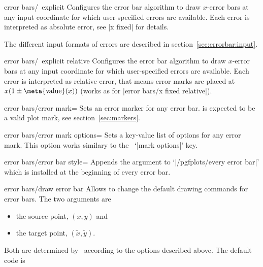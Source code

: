 {\begin{pgfplotsxykey}{error bars/\x\ explicit}
Configures the error bar algorithm to draw $x$-error bars at any input coordinate for which user-specified errors are available.
 Each error is interpreted as absolute error, see |x fixed| for details.

The different input formats of errors are described in section~\ref{sec:errorbar:input}.
\end{pgfplotsxykey}

\begin{pgfplotsxykey}{error bars/\x\ explicit relative}
Configures the error bar algorithm to draw $x$-error bars at any input coordinate for which user-specified errors are available.
 Each error is interpreted as relative error, that means error marks are placed at $x (1 \pm \text{\meta{value}}(x))$ (works as for |error bars/x fixed relative|).
\end{pgfplotsxykey}


\begin{pgfplotskey}{error bars/error mark=}
Sets an error marker for any error bar.  is expected to be a valid plot mark, see section~\ref{sec:markers}.
\end{pgfplotskey}

\begin{pgfplotskey}{error bars/error mark options=}
Sets a key-value list of options for any error mark. This option works similary to the \Tikz\ `|mark options|' key.
\end{pgfplotskey}

\begin{pgfplotskey}{error bars/error bar style=}
Appends the argument to `|/pgfplots/every error bar|' which is installed at the beginning of every error bar.
\end{pgfplotskey}

\begin{pgfplotscodetwokey}{error bars/draw error bar}
Allows to change the default drawing commands for error bars. The two arguments are
\begin{itemize} 
\item the source point, $(x,y)$ and
\item the target point, $(\tilde x,\tilde y)$.
\end{itemize}
Both are determined by \PGFPlots\ according to the options described above. The default code is
\end{pgfplotscodetwokey}

}
